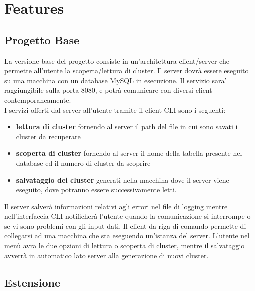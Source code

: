 \section{Features}
\subsection{Progetto Base}
\noindent La versione base del progetto consiste in un'architettura client/server che permette all'utente la scoperta/lettura di cluster. Il server dovrà essere eseguito su una macchina con un database MySQL in esecuzione. 
Il servizio sara' raggiungibile sulla porta 8080, e potrà comunicare con diversi client contemporaneamente. 
\\ I servizi offerti dal server all'utente tramite il client CLI sono i seguenti:
\begin{itemize}[label=-]
  \item \textbf{lettura di cluster} fornendo al server il path del file in cui sono savati i cluster da recuperare 
  \item \textbf{scoperta di cluster} fornendo al server il nome della tabella presente nel database ed il numero di cluster da scoprire
  \item \textbf{salvataggio dei cluster} generati nella macchina dove il server viene eseguito, dove potranno essere successivamente letti. 
\end{itemize}
Il server salverà informazioni relativi agli errori nel file di logging mentre nell'interfaccia CLI notificherà l'utente quando la comunicazione si interrompe o se vi sono problemi con gli input dati. Il client da riga di comando permette di collegarsi ad una macchina che sta eseguendo un'istanza del server. L'utente nel menù avra le due opzioni di lettura o scoperta di cluster, mentre il salvataggio avverrà in automatico lato server alla generazione di nuovi cluster.

\subsection{Estensione}